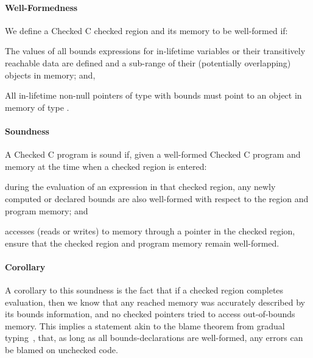 \paragraph{Well-Formedness} We define a Checked C checked region and
its memory to be well-formed if:
\begin{compactitem}
\item The values of all bounds expressions for in-lifetime
variables or their transitively reachable data are defined and a
sub-range of their (potentially overlapping) objects in memory; and,
\item All in-lifetime non-null pointers of type  with bounds
must point to an object in memory of type .
\end{compactitem}

\paragraph{Soundness} A Checked C program is sound if, given a
well-formed Checked C program and memory at the time when a checked
region is entered:
\begin{compactitem}
\item during the evaluation of an expression in that checked region,
any newly computed or declared bounds are also well-formed with
respect to the region and program memory; and
\item accesses (reads or writes) to memory through a pointer in the
checked region, ensure that the checked region and program memory
remain well-formed.
\end{compactitem}

\paragraph{Corollary} A corollary to this soundness is the fact that
if a checked region completes evaluation, then we know that any
reached memory was accurately described by its bounds information, and
no checked pointers tried to access out-of-bounds memory. This implies
a statement akin to the blame theorem from gradual
typing~\cite{wadler09}, that, as long as all bounds-declarations
are well-formed, any errors can be blamed on unchecked code.

